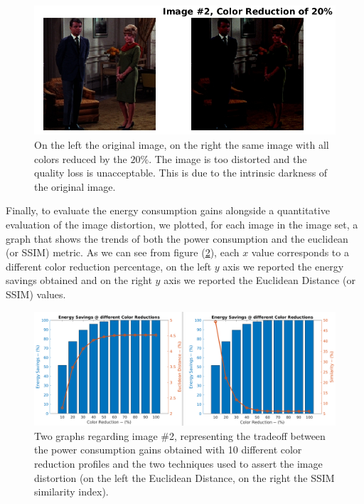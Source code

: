 \documentclass[a4paper]{article}
\begin{document}
            \begin{figure}[htp]
                \centering
                \includegraphics[width=0.6 \columnwidth]{./screenshots/color_reduction_20perc_img_2.jpg}
                \caption{
                        \label{fig:color_reduction_20perc_img_2}
                        On the left the original image, on the right the same image with all colors reduced by the $20\%$. The image is too distorted and the quality loss is unacceptable. This is due to the intrinsic darkness of the original image.
                }
            \end{figure}

            Finally, to evaluate the energy consumption gains alongside a quantitative evaluation of the image distortion, we plotted, for each image in the image set, a graph that shows the trends of both the power consumption and the euclidean (or SSIM) metric. As we can see from figure (\ref{fig:img2_EUCLvSSIM}), each $x$ value corresponds to a different color reduction percentage, on the left $y$ axis we reported the energy savings obtained and on the right $y$ axis we reported the Euclidean Distance (or SSIM) values.

            \begin{figure}[htp]
                \centering
                \includegraphics[width=0.8 \columnwidth]{./screenshots/img2_EUCLvSSIM.png}
                \caption{
                        \label{fig:img2_EUCLvSSIM}
                        Two graphs regarding image \#2, representing the tradeoff between the power consumption gains obtained with 10 different color reduction profiles and the two techniques used to assert the image distortion (on the left the Euclidean Distance, on the right the SSIM similarity index).
                }
            \end{figure}
\end{document}
